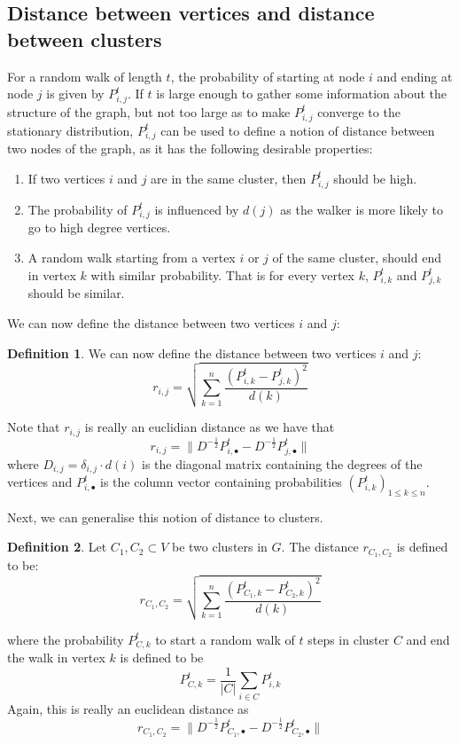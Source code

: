 \documentclass[12pt]{article}
\theoremstyle{definition}
\newtheorem{definition}{Definition}
\begin{document}
\subsection{Distance between vertices and distance between clusters}
For a random walk of length $t$, the probability of starting at node $i$ and ending at node $j$ is given by $P_{i,j}^t$. If $t$ is large enough to gather some information about the structure of the graph, but not too large as to make $P_{i,j}^t$ converge to the stationary distribution, $P_{i,j}^t$ can be used to define a notion of distance between two nodes of the graph, as it has the following desirable properties:
\begin{enumerate}
	\item If two vertices $i$ and $j$ are in the same cluster, then $P_{i,j}^t$ should be high.
	\item The probability of $P_{i,j}^t$ is influenced by $d(j)$ as the walker is more likely to go to high degree vertices.
	\item A random walk starting from a vertex $i$ or $j$ of the same cluster, should end in vertex $k$ with similar probability. That is for every vertex $k$, $P_{i,k}^t$  and $P_{j,k}^t$ should be similar.
\end{enumerate}
We can now define the distance between two vertices $i$ and $j$:
\begin{definition}
	We can now define the distance between two vertices $i$ and $j$:
	\[ r_{i,j} = \sqrt{\sum_{k=1}^n \frac{(P_{i,k}^t - P_{j,k}^t)^2}{d(k)}} \]
\end{definition}
Note that $r_{i,j}$ is really an euclidian distance as we have that
\[ r_{i,j} = \|D^{-\frac{1}{2}}P_{i,\bullet}^t - D^{-\frac{1}{2}}P_{j,\bullet}^t \|\]
where $D_{i,j} = \delta_{i,j} \cdot d(i)$ is the diagonal matrix containing the degrees of the vertices and $P_{i,\bullet}^t$ is the column vector containing probabilities $(P_{i,k}^t)_{1 \le k \le n}$.

\bigskip

Next, we can generalise this notion of distance to clusters.
\begin{definition}
	Let $C_1, C_2 \subset V$ be two clusters in $G$. The distance $r_{C_1,C_2}$ is defined to be:
	\[ r_{C_1,C_2} = \sqrt{\sum_{k=1}^n \frac{(P_{C_1,k}^t - P_{C_2,k}^t)^2}{d(k)}} \]
\end{definition}
where the probability $P_{C,k}^t$ to start a random walk of $t$ steps in cluster $C$ and end the walk in vertex $k$ is defined to be
\[ P_{C,k}^t = \frac{1}{|C|}\sum_{i \in C}P_{i,k}^t\]
Again, this is really an euclidean distance as 
\[  r_{C_1,C_2} = \|D^{-\frac{1}{2}}P_{C_1,\bullet}^t - D^{-\frac{1}{2}}P_{C_2,\bullet}^t \|\]
\end{document}
